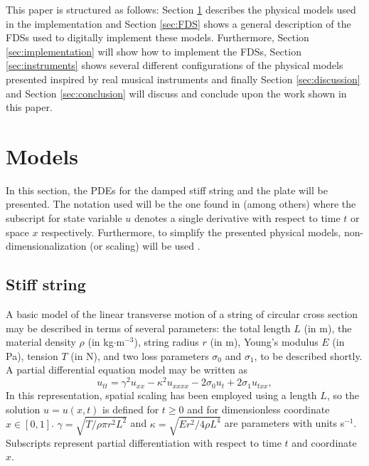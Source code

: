 \documentclass{article}
\begin{document}
This paper is structured as follows: Section \ref{sec:PDE} describes the physical models used in the implementation and Section \ref{sec:FDS} shows a general description of the FDSs used to digitally implement these models. Furthermore, Section \ref{sec:implementation} will show how to implement the FDSs, Section \ref{sec:instruments} shows several different configurations of the physical models presented inspired by real musical instruments and finally Section \ref{sec:discussion} and Section \ref{sec:conclusion} will discuss and conclude upon the work shown in this paper.

\section{Models}\label{sec:PDE}
In this section, the PDEs for the damped stiff string and the plate will be presented. The notation used will be the one found in \cite{Bilbao2009:NumericalSoundSynthesis} (among others) where the subscript for state variable $u$ denotes a single derivative with respect to time $t$ or space $x$ respectively. Furthermore, to simplify the presented physical models, non-dimensionalization (or scaling) will be used \cite{Bilbao2009:NumericalSoundSynthesis}. 


\subsection{Stiff string}\label{subsec:stiffStringPDE}
A basic model of the linear transverse motion of a string of circular cross section may be described in terms of several parameters: the total length $L$ (in m), the material density $\rho$ (in kg$\cdot$m$^{-3}$), string radius $r$ (in m), Young's modulus $E$ (in Pa), tension $T$ (in N), and two loss parameters $\sigma_{0}$ and $\sigma_{1}$, to be described shortly. A partial differential equation model may be written as
 \cite{Bilbao2009:NumericalSoundSynthesis} 
\begin{equation}\label{eq:stiffString}
    u_{tt} = \gamma^2 u_{xx}-\kappa^2u_{xxxx} - 2\sigma_0u_{t} + 2\sigma_1u_{txx},
\end{equation}
In this representation, spatial scaling has been employed using a length $L$, so the solution $u = u(x,t)$ is defined for $t\geq 0$ and for dimensionless coordinate $x\in[0,1]$. $\gamma = \sqrt{T/\rho\pi r^2 L^2}$ and $\kappa = \sqrt{Er^2/4\rho L^4}$ are parameters with units s$^{-1}$. Subscripts represent partial differentiation with respect to time $t$ and coordinate $x$. 
\end{document}

